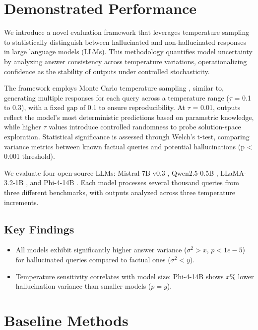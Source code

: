 \documentclass[sigconf]{acmart}
\begin{document}
\section{Demonstrated Performance}

We introduce a novel evaluation framework that leverages temperature sampling to statistically distinguish between hallucinated and non-hallucinated responses in large language models (LLMs). This methodology quantifies model uncertainty by analyzing answer consistency across temperature variations, operationalizing confidence as the stability of outputs under controlled stochasticity.

The framework employs Monte Carlo temperature sampling \cite{monte_carlo_temperature}, similar to, generating multiple responses for each query across a temperature range ($\tau$ = 0.1 to 0.3), with a fixed gap of 0.1 to ensure reproducibility. At $\tau$ = 0.01, outputs reflect the model's most deterministic predictions based on parametric knowledge, while higher $\tau$ values introduce controlled randomness to probe solution-space exploration. Statistical significance is assessed through Welch's t-test, comparing variance metrics between known factual queries and potential hallucinations (p < 0.001 threshold).

We evaluate four open-source LLMs: Mistral-7B v0.3 \cite{mistral_7b}, Qwen2.5-0.5B \cite{Qwen2.5}, LLaMA-3.2-1B \cite{llama_3.2}, and Phi-4-14B \cite{phi_4}. Each model processes several thousand queries from three different benchmarks, with outputs analyzed across three temperature increments.

\subsection{Key Findings}
\begin{itemize}
    \item All models exhibit significantly higher answer variance ($\sigma^2 > x$, $p < 1e-5$) for hallucinated queries compared to factual ones ($\sigma^2 < y$).
    \item Temperature sensitivity correlates with model size: Phi-4-14B shows $x\%$ lower hallucination variance than smaller models ($p = y$).
\end{itemize}


\section{Baseline Methods}
\end{document}
